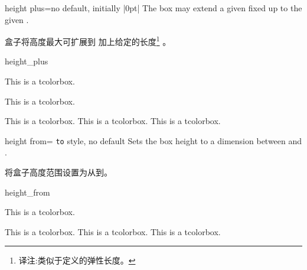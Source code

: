 \begin{docTcbKey}{height plus}{=}{no default, initially |0pt|}
The box may extend a given fixed  up to the given .

盒子将高度最大可扩展到  加上给定的长度\footnote{译注:类似于定义的弹性长度。} 。
\begin{exdispExample}{height_plus}

\begin{tcolorbox}[height=1cm]
This is a tcolorbox.
\end{tcolorbox}
\begin{tcolorbox}[height=1cm,height plus=1cm]
This is a tcolorbox.
\end{tcolorbox}
\begin{tcolorbox}[height=1cm,height plus=1cm]
This is a tcolorbox. This is a tcolorbox. This is a tcolorbox.
\end{tcolorbox}
\end{exdispExample}
\end{docTcbKey}


\begin{docTcbKey}{height from}{= \texttt{to} }{style, no default}
Sets the box height to a dimension between  and .

将盒子高度范围设置为从到。
\begin{exdispExample}{height_from}

\begin{mybox}
This is a tcolorbox.
\end{mybox}
\begin{mybox}
This is a tcolorbox. This is a tcolorbox. This is a tcolorbox.
\end{mybox}
\begin{mybox}
\lipsum[2]
\end{mybox}
\end{exdispExample}
\end{docTcbKey}



